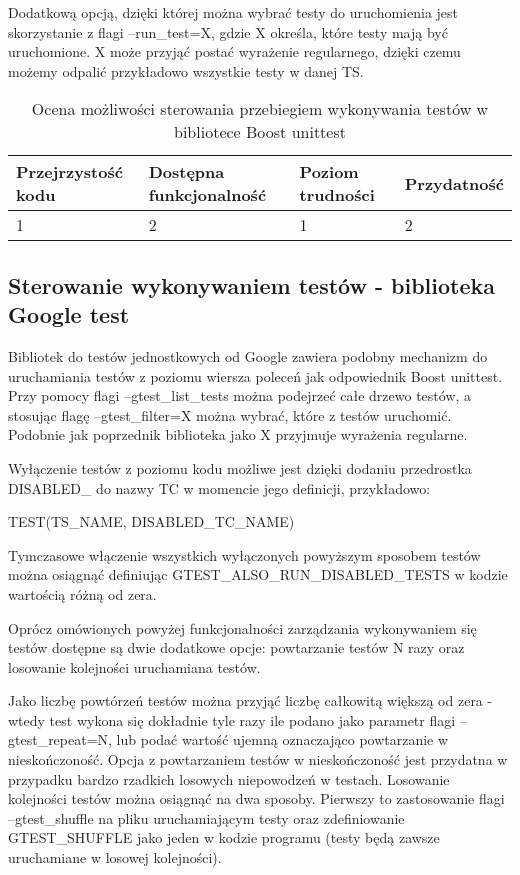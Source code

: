 \documentclass[12pt,a4paper,notitlepage]{report}
\begin{document}
Dodatkową opcją, dzięki której można wybrać testy do uruchomienia jest skorzystanie z flagi --run{\_}test=X, gdzie X określa, które testy mają być uruchomione. X może przyjąć postać wyrażenie regularnego, dzięki czemu możemy odpalić przykładowo wszystkie testy w danej TS.


\begin{center}
			\begin{table}[!ht]
			\caption{Ocena możliwości sterowania przebiegiem wykonywania testów w bibliotece Boost unittest}
			\label{}
			\begin{tabular}[!hc]{|l|l|l|l|}
		\hline
		Przejrzystość kodu 	&	Dostępna funkcjonalność	&	Poziom trudności	&	Przydatność \\ \hline
		1					&	2						&	1					& 	2  			\\ \hline
			\end{tabular}
			\end{table} 
		\end{center}

\subsection{Sterowanie wykonywaniem testów - biblioteka Google test}

Bibliotek do testów jednostkowych od Google zawiera podobny mechanizm do uruchamiania testów z poziomu wiersza poleceń jak odpowiednik Boost unittest.
Przy pomocy flagi --gtest{\_}list{\_}tests można podejrzeć całe drzewo testów, a stosując flagę --gtest{\_}filter=X można wybrać, które z testów uruchomić. Podobnie jak poprzednik biblioteka jako X przyjmuje wyrażenia regularne.

Wyłączenie testów z poziomu kodu możliwe jest dzięki dodaniu przedrostka DISABLED{\_} do nazwy TC w momencie jego definicji, przykładowo:

TEST(TS{\_}NAME, DISABLED{\_}TC{\_}NAME)

Tymczasowe włączenie wszystkich wyłączonych powyższym sposobem testów można osiągnąć definiując GTEST{\_}ALSO{\_}RUN{\_}DISABLED{\_}TESTS w kodzie wartością różną od zera.

Oprócz omówionych powyżej funkcjonalności zarządzania wykonywaniem się testów dostępne są dwie dodatkowe opcje: powtarzanie testów N razy oraz losowanie kolejności uruchamiana testów.

Jako liczbę powtórzeń testów można przyjąć liczbę całkowitą większą od zera - wtedy test wykona się dokładnie tyle razy ile podano jako parametr flagi --gtest{\_}repeat=N, lub podać wartość ujemną oznaczająco powtarzanie w nieskończoność. Opcja z powtarzaniem testów w nieskończoność jest przydatna w przypadku bardzo rzadkich losowych niepowodzeń w testach.
Losowanie kolejności testów można osiągnąć na dwa sposoby. Pierwszy to zastosowanie flagi --gtest{\_}shuffle na pliku uruchamiającym testy oraz zdefiniowanie GTEST{\_}SHUFFLE jako jeden w kodzie programu (testy będą zawsze uruchamiane w losowej kolejności).
\end{document}
